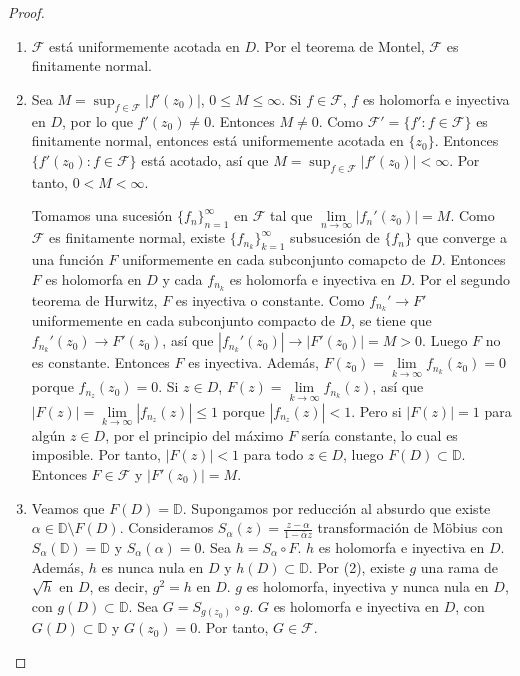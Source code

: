 \begin{proof}
\begin{enumerate}
        \item $\mathcal{F}$ está uniformemente acotada en $D$.
              Por el teorema de Montel, $\mathcal{F}$ es finitamente normal.

        \item Sea $M = \sup_{f \in \mathcal{F}} |f'(z_0)|$, $0 \leq M \leq \infty$.
              Si $f \in \mathcal{F}$, $f$ es holomorfa e inyectiva en $D$, por lo que $f'(z_0) \neq 0$.
              Entonces $M \neq 0$.
              Como $\mathcal{F}' = \{f' : f \in \mathcal{F}\}$ es finitamente normal, entonces está uniformemente acotada en $\{z_0\}$.
              Entonces $\{f'(z_0) : f \in \mathcal{F}\}$ está acotado, así que $M = \sup_{f \in \mathcal{F}} |f'(z_0)| < \infty$.
              Por tanto, $0 < M < \infty$.

              Tomamos una sucesión $\{f_n\}_{n=1}^\infty$ en $\mathcal{F}$ tal que $\lim\limits_{n \to \infty} |f_n'(z_0)| = M$.
              Como $\mathcal{F}$ es finitamente normal, existe $\{f_{n_k}\}_{k=1}^\infty$ subsucesión de $\{f_n\}$ que converge a una función $F$ uniformemente en cada subconjunto comapcto de $D$.
              Entonces $F$ es holomorfa en $D$ y cada $f_{n_k}$ es holomorfa e inyectiva en $D$.
              Por el segundo teorema de Hurwitz, $F$ es inyectiva o constante.
              Como $f_{n_k}' \to F'$ uniformemente en cada subconjunto compacto de $D$, se tiene que $f_{n_k}'(z_0) \to F'(z_0)$, así que $|f_{n_k}'(z_0)| \to |F'(z_0)| = M > 0$.
              Luego $F$ no es constante.
              Entonces $F$ es inyectiva.
              Además, $F(z_0)= \lim\limits_{k \to \infty} f_{n_k}(z_0) = 0$ porque $f_{n_z}(z_0) = 0$.
              Si $z \in D$, $F(z) = \lim\limits_{k \to \infty} f_{n_k}(z)$, así que $|F(z)| = \lim\limits_{k \to \infty} |f_{n_z}(z)| \leq 1$ porque $|f_{n_z}(z)| < 1$.
              Pero si $|F(z)| = 1$ para algún $z \in D$, por el principio del máximo $F$ sería constante, lo cual es imposible.
              Por tanto, $|F(z)| < 1$ para todo $z \in D$, luego $F(D) \subset \mathbb{D}$.
              Entonces $F \in \mathcal{F}$ y $|F'(z_0)| = M$.

        \item Veamos que $F(D) = \mathbb{D}$.
              Supongamos por reducción al absurdo que existe $\alpha \in \mathbb{D} \setminus F(D)$.
              Consideramos $S_\alpha(z) = \frac{z-\alpha}{1-\bar{\alpha}z}$ transformación de Möbius con $S_\alpha(\mathbb{D}) = \mathbb{D}$ y $S_\alpha(\alpha) = 0$.
              Sea $h = S_\alpha \circ F$.
              $h$ es holomorfa e inyectiva en $D$.
              Además, $h$ es nunca nula en $D$ y $h(D) \subset \mathbb{D}$.
              Por (2), existe $g$ una rama de $\sqrt{h}$ en $D$, es decir, $g^2 = h$ en $D$.
              $g$ es holomorfa, inyectiva y nunca nula en $D$, con $g(D) \subset \mathbb{D}$.
              Sea $G = S_{g(z_0)} \circ g$.
              $G$ es holomorfa e inyectiva en $D$, con $G(D) \subset \mathbb{D}$ y $G(z_0) = 0$.
              Por tanto, $G \in \mathcal{F}$.


\end{enumerate}
\end{proof}
